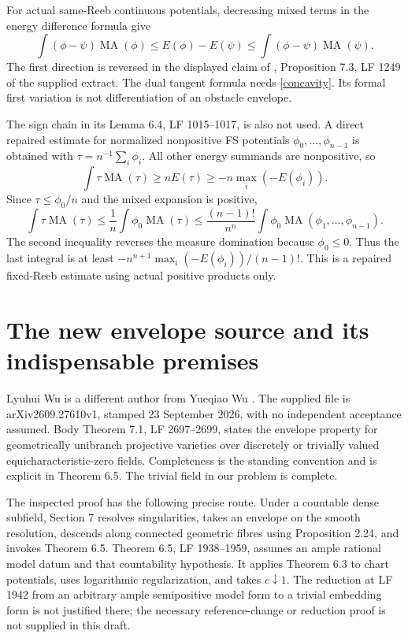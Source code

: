 \documentclass[11pt]{article}
\newcommand{\MA}{\operatorname{MA}}
\begin{document}
For actual same-Reeb continuous potentials, decreasing mixed terms in the energy difference formula give
\begin{equation}\label{concavity}
 \int(\phi-\psi)\MA(\phi)\leq E(\phi)-E(\psi)
 \leq\int(\phi-\psi)\MA(\psi).
\end{equation}
The first direction is reversed in the displayed claim of \cite{YW24}, Proposition 7.3, LF 1249 of the supplied extract.
The dual tangent formula needs \eqref{concavity}.
Its formal first variation is not differentiation of an obstacle envelope.

The sign chain in its Lemma 6.4, LF 1015--1017, is also not used.
A direct repaired estimate for normalized nonpositive FS potentials $\phi_0,\ldots,\phi_{n-1}$ is obtained with $\tau=n^{-1}\sum_i\phi_i$.
All other energy summands are nonpositive, so
\[
 \int\tau\MA(\tau)\geq nE(\tau)\geq -n\max_i(-E(\phi_i)).
\]
Since $\tau\leq\phi_0/n$ and the mixed expansion is positive,
\[
 \int\tau\MA(\tau)\leq\frac1n\int\phi_0\MA(\tau)
 \leq\frac{(n-1)!}{n^n}\int\phi_0\MA(\phi_1,\ldots,\phi_{n-1}).
\]
The second inequality reverses the measure domination because $\phi_0\leq0$.
Thus the last integral is at least $-n^{n+1}\max_i(-E(\phi_i))/(n-1)!$.
This is a repaired fixed-Reeb estimate using actual positive products only.

\section{The new envelope source and its indispensable premises}
Lyuhui Wu \cite{LW26} is a different author from Yueqiao Wu \cite{YW22,YW24}.
The supplied file is arXiv2609.27610v1, stamped 23 September 2026, with no independent acceptance assumed.
Body Theorem 7.1, LF 2697--2699, states the envelope property for geometrically unibranch projective varieties over discretely or trivially valued equicharacteristic-zero fields.
Completeness is the standing convention and is explicit in Theorem 6.5.
The trivial field in our problem is complete.

The inspected proof has the following precise route.
Under a countable dense subfield, Section 7 resolves singularities, takes an envelope on the smooth resolution, descends along connected geometric fibres using Proposition 2.24, and invokes Theorem 6.5.
Theorem 6.5, LF 1938--1959, assumes an ample rational model datum and that countability hypothesis.
It applies Theorem 6.3 to chart potentials, uses logarithmic regularization, and takes $c\downarrow1$.
The reduction at LF 1942 from an arbitrary ample semipositive model form to a trivial embedding form is not justified there; the necessary reference-change or reduction proof is not supplied in this draft.
\end{document}
